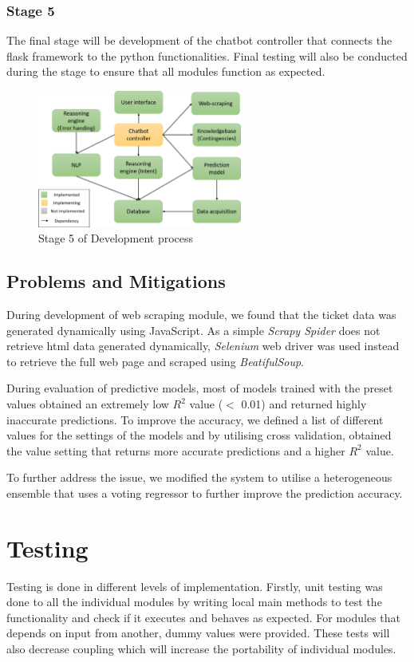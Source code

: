 \documentclass[11pt]{article}
\begin{document}
\subsubsection{Stage 5}
The final stage will be development of the chatbot controller that connects the flask framework to the python functionalities. Final testing will also be conducted during the stage to ensure that all modules function as expected. 
\begin{figure}[!htb]
	\centering
	\includegraphics[width=0.6\textwidth]{Stage_5}
	\caption{Stage 5 of Development process }\label{fig:Stage 5}
\end{figure}
\subsection{Problems and Mitigations}
During development of web scraping module, we found that the ticket data was generated dynamically using JavaScript. As a simple \textit{Scrapy Spider} does not retrieve html data generated dynamically, \textit{Selenium} web driver was used instead to retrieve the full web page and scraped using \textit{BeatifulSoup}.

During evaluation of predictive models, most of models trained with the preset values obtained an extremely low $R^2$ value ($<$ 0.01) and returned highly inaccurate predictions. To improve the accuracy, we defined a list of different values for the settings of the models and by utilising cross validation, obtained the value setting that returns more accurate predictions and a higher $R^2$ value.

To further address the issue, we modified the system to utilise a heterogeneous ensemble that uses a voting regressor to further improve the prediction accuracy.

\section{Testing}
Testing is done in different levels of implementation. Firstly, unit testing was done to all the individual modules by writing local main methods to test the functionality and check if it executes and behaves as expected. For modules that depends on input from another, dummy values were provided. These tests will also decrease coupling which will increase the portability of individual modules.
\end{document}

